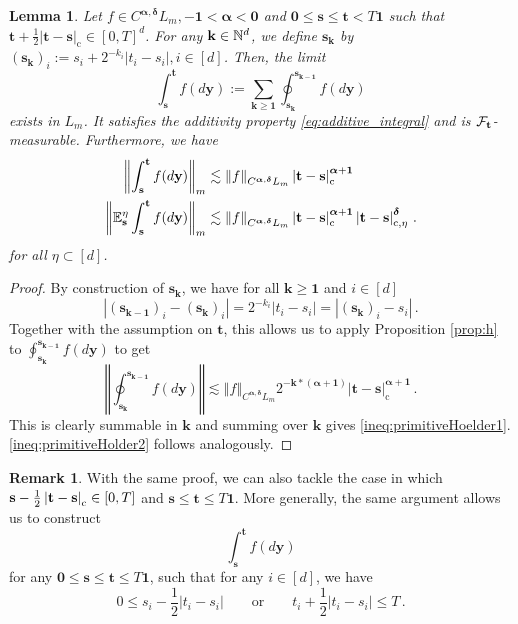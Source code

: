 \documentclass[12pt]{article}
\numberwithin{equation}{section}
\theoremstyle{plain}
\newtheorem{lemma}[theorem]{Lemma}
\theoremstyle{definition}
\newtheorem{remark}[theorem]{Remark}
\newcommand{\abs}[1]{\left\vert #1 \right\vert}
\newcommand{\compAbs}[1]{\left\vert#1\right\vert_{\text{c}}}
\newcommand{\norm}[1]{\left\Vert #1\right\Vert}
\def\bE{\mathbb{E}}\def\bW{\mathbb{W}}
\def\fk{\mathbf k}\def\fl{\mathbf l}
\def\fs{\mathbf s}\def\ft{\mathbf t}
\def\fy{\mathbf y}\def\fz{\mathbf z}
\def\falpha{{\boldsymbol\alpha}}
\def\fdelta{{\boldsymbol\delta}}
\def\foo{{\boldsymbol 0}}
\def\fone{{\boldsymbol 1}}
\begin{document}
\begin{lemma}\label{prop:integration}
Let $f\in C^{\falpha,\fdelta}L_m, -\fone<\falpha<\foo$ and $\foo\le\fs\le\ft< T\fone$ such that $\ft+\frac 12\compAbs{\ft-\fs} \in [0,T]^d$. For any $\fk\in \bN^d$, we define $\fs_\fk$ by $(\fs_\fk)_i := s_i +2^{-k_i}\abs{t_i-s_i}, i\in[d]$. Then, the limit
\begin{equation*}
    \int_\fs^\ft f(d\fy) := \sum_{\fk\ge \fone}\oint_{\fs_\fk}^{\fs_{\fk-\fone}} f(d\fy)
\end{equation*}
exists in $L_m$. It satisfies the additivity property \eqref{eq:additive_integral} and is $\cF_\ft$-measurable. Furthermore, we have
\begin{align}
    \norm{\int_\fs^\ft f(d\fy)}_m &\lesssim \norm{f}_{C^{\falpha,\fdelta}L_m}\abs{\ft-\fs}_{\text c}^{\falpha+\fone} \label{ineq:primitiveHoelder1}\\
    \norm{\bE^\eta_\fs\int_\fs^\ft f(d\fy)}_m &\lesssim \norm{f}_{C^{\falpha,\fdelta}L_m}\abs{\ft-\fs}_{\text c}^{\falpha+\fone}\abs{\ft-\fs}_{\text c,\eta}^{\fdelta}\,.\label{ineq:primitiveHolder2}
\end{align}
for all $\eta\subset[d]$.
\end{lemma}

\begin{proof}
    By construction of $\fs_\fk$, we have for all $\fk\ge\fone$ and $i\in[d]$
    \begin{equation*}
        \abs{(\fs_{\fk-\fone})_i-(\fs_\fk)_i} = 2^{-k_i}\abs{t_i-s_i} = \abs{(\fs_\fk)_i-s_i}\,.
    \end{equation*}
    Together with the assumption on $\ft$, this allows us to apply Proposition \ref{prop:h} to $\oint_{\fs_\fk}^{\fs_{\fk-\fone}} f(d\fy)$ to get
    \[
        \norm{\oint_{\fs_\fk}^{\fs_{\fk-\fone}} f(d\fy)} \lesssim \norm{f}_{C^{\falpha,\fdelta}L_m}2^{-\fk*(\falpha+\fone)}\compAbs{\ft-\fs}^{\falpha+\fone}\,.
    \]
    This is clearly summable in $\fk$ and summing over $\fk$ gives \eqref{ineq:primitiveHoelder1}. \eqref{ineq:primitiveHolder2} follows analogously.
\end{proof}

\begin{remark}
    With the same proof, we can also tackle the case in which $\fs-\frac 12\abs{\ft-\fs}_{\text c} \in[0,T]$ and $\fs\le\ft\le T\fone$. More generally, the same argument allows us to construct
    \[
        \int_\fs^\ft f(d\fy)
    \]
    for any $\foo\le\fs\le\ft\le T\fone$, such that for any $i\in[d]$, we have
    \[
        0\le s_i-\frac 12\abs{t_i-s_i} \qquad\text{or}\qquad t_i+\frac 12\abs{t_i-s_i}\le T\,.
    \]
\end{remark}
\end{document}
